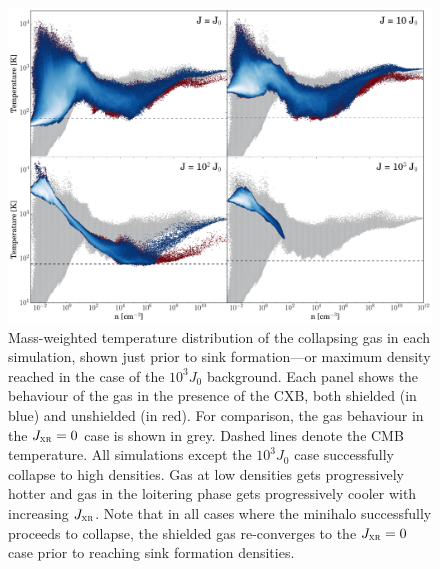\documentclass{thesis}
\newcommand{\jxr}{\ensuremath{J_{\textsc{xr}}}\xspace}
\begin{document}
\begin{figure}
  \begin{center}
    \includegraphics[width=\columnwidth]{figures/phase_diagrams/temp}
    \caption{Mass-weighted temperature distribution of the collapsing gas in each simulation, shown just prior to sink formation---or maximum density reached in the case of the $10^3 J_0$ background. Each panel shows the behaviour of the gas in the presence of the CXB, both shielded (in blue) and unshielded (in red). For comparison, the gas behaviour in the $\jxr=0$ case is shown in grey.  Dashed lines denote the CMB temperature. All simulations except the $10^3 J_0$ case successfully collapse to high densities.  Gas at low densities gets progressively hotter and gas in the loitering phase gets progressively cooler with increasing \jxr. Note that in all cases where the minihalo successfully proceeds to collapse, the shielded gas re-converges to the $\jxr=0$ case prior to reaching sink formation densities.}
    \label{Tdens}
  \end{center}
\end{figure}
\end{document}
